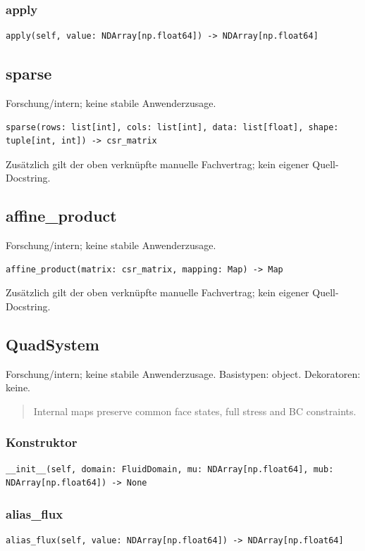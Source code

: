 \subsubsection*{apply}
\begin{lstlisting}
apply(self, value: NDArray[np.float64]) -> NDArray[np.float64]
\end{lstlisting}
\subsection{sparse}
Forschung/intern; keine stabile Anwenderzusage.
\begin{lstlisting}
sparse(rows: list[int], cols: list[int], data: list[float], shape: tuple[int, int]) -> csr_matrix
\end{lstlisting}
Zusätzlich gilt der oben verknüpfte manuelle Fachvertrag; kein eigener Quell-Docstring.
\subsection{affine\_product}
Forschung/intern; keine stabile Anwenderzusage.
\begin{lstlisting}
affine_product(matrix: csr_matrix, mapping: Map) -> Map
\end{lstlisting}
Zusätzlich gilt der oben verknüpfte manuelle Fachvertrag; kein eigener Quell-Docstring.
\subsection{QuadSystem}
Forschung/intern; keine stabile Anwenderzusage.
Basistypen: object. Dekoratoren: keine.
\begin{quote}
Internal maps preserve common face states, full stress and BC constraints.
\end{quote}
\subsubsection*{Konstruktor}
\begin{lstlisting}
__init__(self, domain: FluidDomain, mu: NDArray[np.float64], mub: NDArray[np.float64]) -> None
\end{lstlisting}
\subsubsection*{alias\_flux}
\begin{lstlisting}
alias_flux(self, value: NDArray[np.float64]) -> NDArray[np.float64]
\end{lstlisting}
